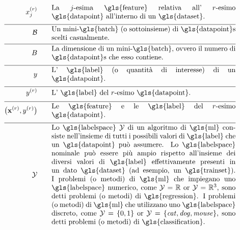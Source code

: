 \begin{align}
	\feature_{\featureidx}^{(\sampleidx)}\quad\quad &\parbox{.75\textwidth}{La $\featureidx$-esima \gls{feature} relativa all' $\sampleidx$-esimo 
		\gls{datapoint} all'interno di un \gls{dataset}.} \nonumber \\[2mm] \hline \nonumber\\[-5mm]
	\batch \quad\quad &\parbox{.75\textwidth}{Un mini-\gls{batch} (o sottoinsieme) di \gls{datapoint}s scelti casualmente.}\nonumber \\[2mm] \hline \nonumber\\[-5mm]
	\batchsize \quad\quad &\parbox{.75\textwidth}{La dimensione di un mini-\gls{batch}, ovvero il numero di \gls{datapoint}s che esso contiene.}\nonumber \\[2mm] \hline \nonumber\\[-5mm]
	\truelabel \quad\quad &\parbox{.75\textwidth}{L' \gls{label} (o quantità di interesse) di un \gls{datapoint}.} \nonumber \\[2mm] \hline \nonumber\\[-5mm]
	\truelabel^{(\sampleidx)} \quad\quad &\parbox{.75\textwidth}{L' \gls{label} del $\sampleidx$-esimo \gls{datapoint}.} \nonumber \\[2mm] \hline \nonumber\\[-5mm]
	\big(\featurevec^{(\sampleidx)},\truelabel^{(\sampleidx)}\big)  \quad\quad &\parbox{.75\textwidth}{Le \gls{feature} e le \gls{label} del $\sampleidx$-esimo \gls{datapoint}.}\nonumber \\[2mm] \hline \nonumber\\[-5mm]
	\labelspace  \quad\quad & \parbox{.75\textwidth}{Lo \gls{labelspace} $\labelspace$ di un algoritmo di \gls{ml} consiste nell’insieme di tutti i possibili valori di \gls{label} che un \gls{datapoint} può assumere. Lo \gls{labelspace} nominale può essere più ampio rispetto all’insieme dei diversi valori di \gls{label} effettivamente presenti in un dato \gls{dataset} (ad esempio, un \gls{trainset}). I problemi (o metodi) di \gls{ml} che impiegano uno \gls{labelspace} numerico, come $\labelspace=\mathbb{R}$ 
		or $\labelspace=\mathbb{R}^{3}$, sono detti problemi (o metodi) di \gls{regression}. I problemi (o metodi) di \gls{ml} che utilizzano uno \gls{labelspace} discreto, come $\labelspace=\{0,1\}$ or $\labelspace=\{\mbox{\emph{cat}},\mbox{\emph{dog}},\mbox{\emph{mouse}}\}$, 
		sono detti problemi (o metodi) di \gls{classification}.}  \nonumber %
\end{align}                  



